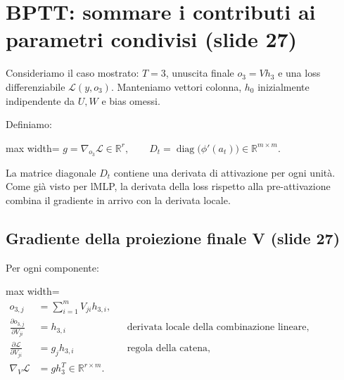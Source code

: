 \documentclass[11pt,a4paper,oneside,openany]{book}
\begin{document}
\section{BPTT: sommare i contributi ai parametri condivisi (slide 27)}\label{f03-r410}

Consideriamo il caso mostrato: \(T=3\), un\textquotesingle uscita finale \(o_3=Vh_3\) e una loss differenziabile \(\mathcal L(y,o_3)\). Manteniamo vettori colonna, \(h_0\) inizialmente indipendente da \(U,W\) e bias omessi.

Definiamo:

\begin{center}
\begin{adjustbox}{max width=\linewidth}
$\displaystyle 
\boxed{g=\nabla_{o_3}\mathcal L\in\mathbb R^r,\qquad
D_t=\operatorname{diag}\bigl(\phi'(a_t)\bigr)\in\mathbb R^{m\times m}.}
$
\end{adjustbox}
\end{center}

La matrice diagonale \(D_t\) contiene una derivata di attivazione per ogni unità. Come già visto per l\textquotesingle MLP, la derivata della loss rispetto alla pre-attivazione combina il gradiente in arrivo con la derivata locale.

\subsection{Gradiente della proiezione finale V (slide 27)}\label{f03-r423}

Per ogni componente:

\begin{center}
\begin{adjustbox}{max width=\linewidth}
$\displaystyle 
\begin{aligned}
o_{3,j}&=\sum_{i=1}^{m}V_{ji}h_{3,i},\\
\frac{\partial o_{3,j}}{\partial V_{ji}}&=h_{3,i}
&&\text{derivata locale della combinazione lineare},\\
\frac{\partial\mathcal L}{\partial V_{ji}}&=g_jh_{3,i}
&&\text{regola della catena},\\
\boxed{\nabla_V\mathcal L}&=\boxed{g h_3^T\in\mathbb R^{r\times m}.}
\end{aligned}
$
\end{adjustbox}
\end{center}
\end{document}
